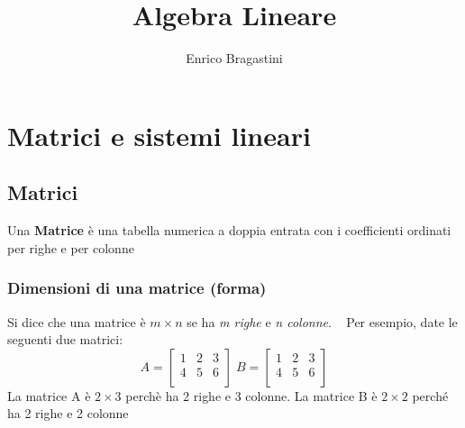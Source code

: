 \documentclass[12pt,oneside]{book}
\title{\Large{\textbf{Algebra Lineare}}}
\author{Enrico Bragastini}
\begin{document}
\pagestyle{fancy}
\fancyhf{}
\rhead{}
\lhead{\nouppercase\leftmark}
\cfoot{\thepage}
\frontmatter

\maketitle
\tableofcontents

\mainmatter
\chapter{Matrici e sistemi lineari}

\section{Matrici}
Una \textbf{Matrice} è una tabella numerica a doppia entrata con i coefficienti ordinati per righe
e per colonne

\subsection{Dimensioni di una matrice (forma)}
Si dice che una matrice è $m \times n$ se ha \emph{m righe} e \emph{n colonne}.
~\newline
Per esempio, date le seguenti due matrici:
\begin{equation*}
    A =
    \begin{bmatrix}
        1 & 2 & 3 \\
        4 & 5 & 6 \\
    \end{bmatrix}
    \; B =
    \begin{bmatrix}
        1 & 2 & 3 \\
        4 & 5 & 6 \\
    \end{bmatrix}
\end{equation*}
La matrice A è $2 \times 3$ perchè ha 2 righe e 3 colonne. \newline La matrice B è $2 \times 2$ perché ha 2 righe
e 2 colonne
\end{document}
